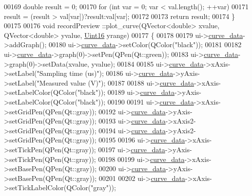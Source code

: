 \begin{DoxyCode}
00169     \textcolor{keywordtype}{double} result = 0;
00170     \textcolor{keywordflow}{for} (\textcolor{keywordtype}{int} var = 0; var < val.length(); ++var)
00171         result = (result > val[var])?result:val[var];
00172 
00173     \textcolor{keywordflow}{return} result;
00174 \}
00175 
00176 \textcolor{keywordtype}{void} recordPreview ::plot\_curve(QVector<double> xvalue, QVector<double> yvalue, 
      \hyperlink{a00004_aae7407b021d43f7193a81a58cfb3e297}{Uint16} yrange)
00177 \{
00178 
00179   ui->\hyperlink{a00081_a247d94481323c0bc4f8b6458a8a535dd}{curve\_data}->addGraph();
00180   ui->\hyperlink{a00081_a247d94481323c0bc4f8b6458a8a535dd}{curve\_data}->setColor(QColor(\textcolor{stringliteral}{"black"}));
00181 
00182   ui->\hyperlink{a00081_a247d94481323c0bc4f8b6458a8a535dd}{curve\_data}->graph(0)->setPen(QPen(Qt::green));
00183   ui->\hyperlink{a00081_a247d94481323c0bc4f8b6458a8a535dd}{curve\_data}->graph(0)->setData(xvalue, yvalue);
00184 
00185   ui->\hyperlink{a00081_a247d94481323c0bc4f8b6458a8a535dd}{curve\_data}->xAxis->setLabel(\textcolor{stringliteral}{"Sampling time (us)"});
00186   ui->\hyperlink{a00081_a247d94481323c0bc4f8b6458a8a535dd}{curve\_data}->yAxis->setLabel(\textcolor{stringliteral}{"Measured value (V)"});
00187 
00188   ui->\hyperlink{a00081_a247d94481323c0bc4f8b6458a8a535dd}{curve\_data}->xAxis->setLabelColor(QColor(\textcolor{stringliteral}{"black"}));
00189   ui->\hyperlink{a00081_a247d94481323c0bc4f8b6458a8a535dd}{curve\_data}->yAxis->setLabelColor(QColor(\textcolor{stringliteral}{"black"}));
00190 
00191   ui->\hyperlink{a00081_a247d94481323c0bc4f8b6458a8a535dd}{curve\_data}->xAxis->setGridPen(QPen(Qt::gray));
00192   ui->\hyperlink{a00081_a247d94481323c0bc4f8b6458a8a535dd}{curve\_data}->yAxis->setGridPen(QPen(Qt::gray));
00193   ui->\hyperlink{a00081_a247d94481323c0bc4f8b6458a8a535dd}{curve\_data}->xAxis2->setGridPen(QPen(Qt::gray));
00194   ui->\hyperlink{a00081_a247d94481323c0bc4f8b6458a8a535dd}{curve\_data}->yAxis2->setGridPen(QPen(Qt::gray));
00195 
00196   ui->\hyperlink{a00081_a247d94481323c0bc4f8b6458a8a535dd}{curve\_data}->xAxis->setTickPen(QPen(Qt::gray));
00197   ui->\hyperlink{a00081_a247d94481323c0bc4f8b6458a8a535dd}{curve\_data}->yAxis->setTickPen(QPen(Qt::gray));
00198 
00199   ui->\hyperlink{a00081_a247d94481323c0bc4f8b6458a8a535dd}{curve\_data}->xAxis->setBasePen(QPen(Qt::gray));
00200   ui->\hyperlink{a00081_a247d94481323c0bc4f8b6458a8a535dd}{curve\_data}->yAxis->setBasePen(QPen(Qt::gray));
00201 
00202   ui->\hyperlink{a00081_a247d94481323c0bc4f8b6458a8a535dd}{curve\_data}->xAxis->setTickLabelColor(QColor(\textcolor{stringliteral}{"gray"}));

\end{DoxyCode}
